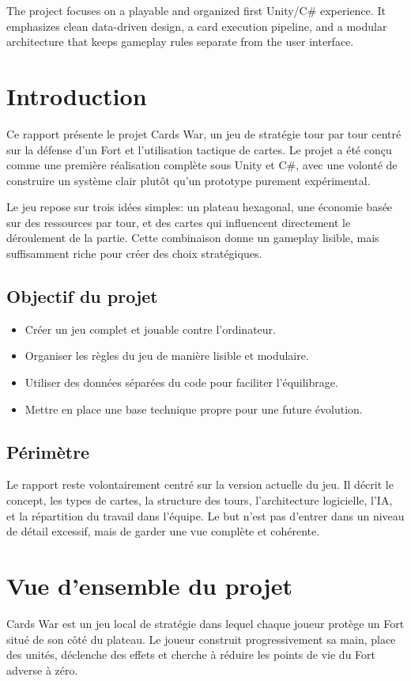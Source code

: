 \documentclass[12pt,a4paper]{article}
\begin{document}
The project focuses on a playable and organized first Unity/C\# experience. It emphasizes clean data-driven design, a card execution pipeline, and a modular architecture that keeps gameplay rules separate from the user interface.

\setcounter{page}{1}

\section{Introduction}
Ce rapport présente le projet Cards War, un jeu de stratégie tour par tour centré sur la défense d'un Fort et l'utilisation tactique de cartes. Le projet a été conçu comme une première réalisation complète sous Unity et C\#, avec une volonté de construire un système clair plutôt qu'un prototype purement expérimental.

Le jeu repose sur trois idées simples: un plateau hexagonal, une économie basée sur des ressources par tour, et des cartes qui influencent directement le déroulement de la partie. Cette combinaison donne un gameplay lisible, mais suffisamment riche pour créer des choix stratégiques.

\subsection{Objectif du projet}
\begin{itemize}[leftmargin=1.2cm]
    \item Créer un jeu complet et jouable contre l'ordinateur.
    \item Organiser les règles du jeu de manière lisible et modulaire.
    \item Utiliser des données séparées du code pour faciliter l'équilibrage.
    \item Mettre en place une base technique propre pour une future évolution.
\end{itemize}

\subsection{Périmètre}
Le rapport reste volontairement centré sur la version actuelle du jeu. Il décrit le concept, les types de cartes, la structure des tours, l'architecture logicielle, l'IA, et la répartition du travail dans l'équipe. Le but n'est pas d'entrer dans un niveau de détail excessif, mais de garder une vue complète et cohérente.

\section{Vue d'ensemble du projet}
Cards War est un jeu local de stratégie dans lequel chaque joueur protège un Fort situé de son côté du plateau. Le joueur construit progressivement sa main, place des unités, déclenche des effets et cherche à réduire les points de vie du Fort adverse à zéro.
\end{document}
